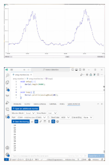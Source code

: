 \begin{center}
    \includegraphics[width=0.4\textwidth]{./graphics/screenshot-emg.jpg}
    \label{figure:screenshot}
\end{center}

\begin{center}
    \includegraphics[width=0.4\textwidth]{./graphics/screenshot-serial.png}
    \label{figure:output}
\end{center}

